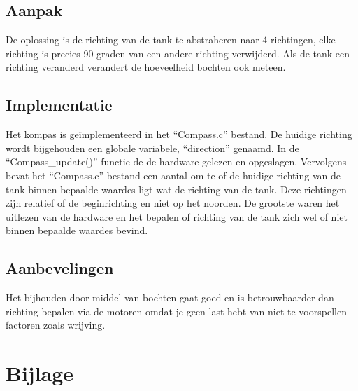 \documentclass{report}
\begin{document}
\section{Aanpak}
De oplossing is de richting van de tank te abstraheren naar 4 richtingen, elke richting is precies 90 graden van een andere richting verwijderd. Als de tank een richting veranderd verandert de hoeveelheid bochten ook meteen.
\section{Implementatie}
Het kompas is geïmplementeerd in het “Compass.c” bestand. De huidige richting wordt bijgehouden een globale variabele, “direction” genaamd. In de “Compass\_update()” functie de de hardware gelezen en opgeslagen. Vervolgens bevat het “Compass.c” bestand een aantal om te of de huidige richting van de tank binnen bepaalde waardes ligt wat de richting van de tank. Deze richtingen zijn relatief of de beginrichting en niet op het noorden. De grootste waren het uitlezen van de hardware en het bepalen of richting van de tank zich wel of niet binnen bepaalde waardes bevind.
\section{Aanbevelingen}
Het bijhouden door middel van bochten gaat goed en is betrouwbaarder dan richting bepalen via de motoren omdat je geen last hebt van niet te voorspellen factoren zoals wrijving. 

\chapter*{Bijlage}
\label{chap:Bijlage}
 
\end{document}
